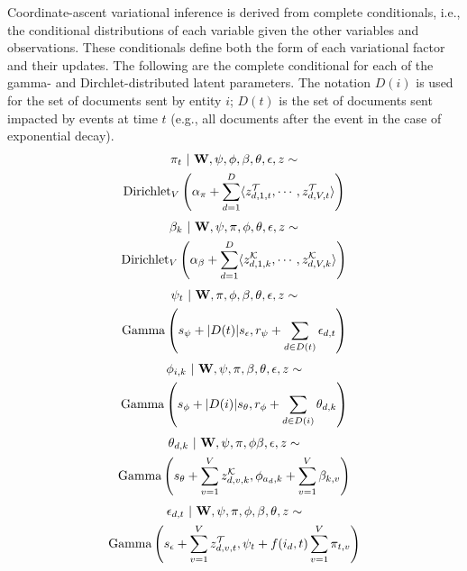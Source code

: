 Coordinate-ascent variational inference is derived from complete conditionals, i.e., the conditional distributions of each variable given the other variables and observations. These conditionals define both the form of each variational factor and their updates. The following are the complete conditional for each of the gamma- and Dirchlet-distributed latent parameters.  The notation $D(i)$ is used for the set of documents sent by entity $i$; $D(t)$ is the set of documents sent impacted by events at time $t$ (e.g., all documents after the event in the case of exponential decay).
\begin{multline}
\pi_t ~\vert~ \mathbf{W}, \psi, \phi, \beta, \theta, \epsilon, z \sim \\
	\mbox{Dirichlet}_V\left(\alpha_\pi + \sum_{d=1}^D \langle
		z^\mathcal{T}_{d,1,t}, \cdots, z^\mathcal{T}_{d,V,t}\rangle
	\right)
\label{eq:pi}
\end{multline}
\begin{multline}
\beta_k ~\vert~ \mathbf{W}, \psi, \pi, \phi, \theta, \epsilon, z \sim \\
	\mbox{Dirichlet}_V\left(\alpha_\beta + \sum_{d=1}^D \langle
		z^\mathcal{K}_{d,1,k}, \cdots, z^\mathcal{K}_{d,V,k}\rangle
	\right)
\label{eq:beta}
\end{multline}
\begin{multline}
\psi_t ~\vert~ \mathbf{W}, \pi, \phi, \beta, \theta, \epsilon, z \sim \\
	\mbox{Gamma}\left(
		s_\psi + |D(t)| s_\epsilon,
		r_\psi + \sum_{d\in D(t)} \epsilon_{d,t}
	\right)
\label{eq:psi}
\end{multline}
\begin{multline}
\phi_{i,k} ~\vert~ \mathbf{W}, \psi, \pi, \beta, \theta, \epsilon, z \sim \\
	\mbox{Gamma}\left(
		s_\phi + |D(i)| s_\theta,
		r_\phi + \sum_{d\in D(i)} \theta_{d,k}
	\right)
\label{eq:phi}
\end{multline}
\begin{multline}
\theta_{d,k} ~\vert~ \mathbf{W}, \psi, \pi, \phi \beta, \epsilon, z \sim \\
	\mbox{Gamma}\left(
		s_\theta + \sum_{v=1}^V z^\mathcal{K}_{d,v,k},
		\phi_{a_d,k} + \sum_{v=1}^V \beta_{k,v}
	\right)
\label{eq:theta}
\end{multline}
\begin{multline}
\epsilon_{d,t} ~\vert~ \mathbf{W}, \psi, \pi, \phi, \beta, \theta, z \sim \\
	\mbox{Gamma}\left(
		s_\epsilon + \sum_{v=1}^V z^\mathcal{T}_{d,v,t},
		\psi_t + f(i_d, t) \sum_{v=1}^V \pi_{t,v}
	\right)
\label{eq:epsilon}
\end{multline}

